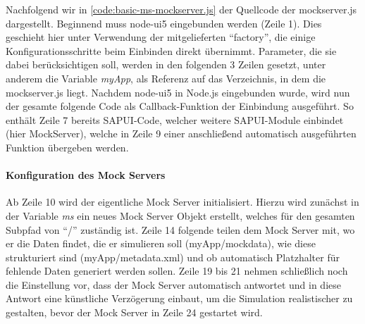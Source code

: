 Nachfolgend wir in \autoref{code:basic-ms-mockserver.js} der Quellcode der mockserver.js dargestellt.
Beginnend muss node-ui5 eingebunden werden (Zeile 1).
Dies geschieht hier unter Verwendung der mitgelieferten \enquote{factory}, die einige Konfigurationsschritte beim Einbinden direkt übernimmt.
Parameter, die sie dabei berücksichtigen soll, werden in den folgenden 3 Zeilen gesetzt, unter anderem die Variable \emph{myApp}, als Referenz auf das Verzeichnis, in dem die mockserver.js liegt.
Nachdem node-ui5 in Node.js eingebunden wurde, wird nun der gesamte folgende Code als Callback-Funktion der Einbindung ausgeführt.
So enthält Zeile 7 bereits SAPUI-Code, welcher weitere SAPUI-Module einbindet (hier MockServer), welche in Zeile 9 einer anschließend automatisch ausgeführten Funktion übergeben werden.

\paragraph{Konfiguration des Mock Servers}
Ab Zeile 10 wird der eigentliche Mock Server initialisiert.
Hierzu wird zunächst in der Variable \emph{ms} ein neues Mock Server Objekt erstellt, welches für den gesamten Subpfad von \enquote{/} zuständig ist.
Zeile 14 folgende teilen dem Mock Server mit, wo er die Daten findet, die er simulieren soll (myApp/mockdata), wie diese strukturiert sind (myApp/metadata.xml) und ob automatisch Platzhalter für fehlende Daten generiert werden sollen.
Zeile 19 bis 21 nehmen schließlich noch die Einstellung vor, dass der Mock Server automatisch antwortet und in diese Antwort eine künstliche Verzögerung einbaut, um die Simulation realistischer zu gestalten, bevor der Mock Server in Zeile 24 gestartet wird.

